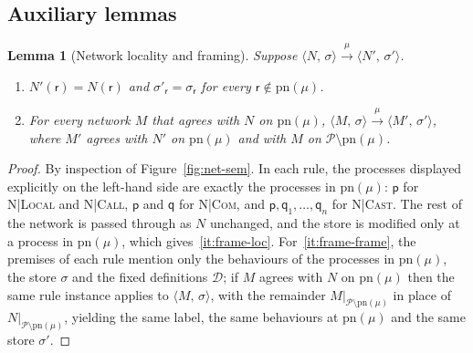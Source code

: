 \documentclass[11pt]{article}
\theoremstyle{plain}
\newtheorem{lemma}[theorem]{Lemma}
\theoremstyle{definition}
\theoremstyle{remark}
\newcommand{\pp}{\mathsf{p}}
\newcommand{\qq}{\mathsf{q}}
\newcommand{\rr}{\mathsf{r}}
\newcommand{\Procs}{\mathcal{P}}
\newcommand{\pn}{\mathrm{pn}}
\newcommand{\conf}[2]{\langle #1,\, #2\rangle}
\newcommand{\lto}[1]{\xrightarrow{\;#1\;}}
\newcommand{\rn}[1]{{\normalfont\scshape #1}}
\newcommand{\restr}[2]{#1|_{#2}}
\newcommand{\NDefs}{\mathcal{D}}
\begin{document}
\subsection{Auxiliary lemmas}

\begin{lemma}[Network locality and framing]\label{lem:frame}
  Suppose $\conf{N}{\sigma}\lto{\mu}\conf{N'}{\sigma'}$.
  \begin{enumerate}[label=(\roman*),nosep]
  \item\label{it:frame-loc} $N'(\rr) = N(\rr)$ and $\sigma'_\rr = \sigma_\rr$ for every $\rr\notin\pn(\mu)$.
  \item\label{it:frame-frame} For every network $M$ that agrees with $N$ on
    $\pn(\mu)$, $\conf{M}{\sigma}\lto{\mu}\conf{M'}{\sigma'}$, where $M'$
    agrees with $N'$ on $\pn(\mu)$ and with $M$ on $\Procs\setminus\pn(\mu)$.
  \end{enumerate}
\end{lemma}
\begin{proof}
  By inspection of Figure~\ref{fig:net-sem}.  In each rule, the processes
  displayed explicitly on the left-hand side are exactly the processes in
  $\pn(\mu)$: $\pp$ for \rn{N|Local} and \rn{N|Call}, $\pp$ and $\qq$ for
  \rn{N|Com}, and $\pp,\qq_1,\ldots,\qq_n$ for \rn{N|Cast}.  The rest of the
  network is passed through as $N$ unchanged, and the store is modified only
  at a process in $\pn(\mu)$, which gives~\ref{it:frame-loc}.
  For~\ref{it:frame-frame}, the premises of each rule mention only the
  behaviours of the processes in $\pn(\mu)$, the store $\sigma$ and the fixed
  definitions $\NDefs$; if $M$ agrees with $N$ on $\pn(\mu)$ then the same
  rule instance applies to $\conf{M}{\sigma}$, with the remainder
  $\restr{M}{\Procs\setminus\pn(\mu)}$ in place of
  $\restr{N}{\Procs\setminus\pn(\mu)}$, yielding the same label, the same
  behaviours at $\pn(\mu)$ and the same store $\sigma'$.
\end{proof}
\end{document}

